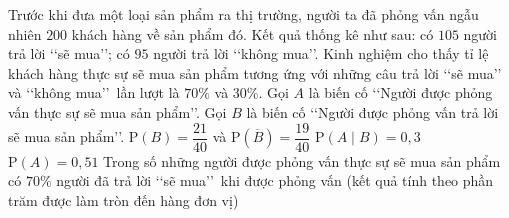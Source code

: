 \begin{ex}%
    Trước khi đưa một loại sản phẩm ra thị trường, người ta đã phỏng vấn ngẫu nhiên $200$ khách hàng về sản phẩm đó. Kết quả thống kê như sau: có $105$ người trả lời 
    \lq\lq  sẽ mua\rq\rq; có $95$ người trả lời \lq\lq  không mua\rq\rq.
    Kinh nghiệm cho thấy tỉ lệ khách hàng thực sự sẽ mua sản phẩm tương ứng với những câu trả lời \lq\lq  sẽ mua\rq\rq\, và \lq\lq  không mua\rq\rq\, lần lượt là $70\%$ và $30\%$. Gọi $A$ là biến cố \lq\lq  Người được phỏng vấn thực sự sẽ mua sản phẩm\rq\rq. Gọi $B$ là biến cố \lq\lq  Người được phỏng vấn trả lời sẽ mua sản phẩm\rq\rq.
    \choiceTF
    {\True $\mathrm{P}(B) = \dfrac{21}{40}$ và $\mathrm{P}(\overline{B}) = \dfrac{19}{40}$}
    {$\mathrm{P}(A \mid B) = 0{,}3$}
    {\True $\mathrm{P}(A) = 0{,}51$}
    {Trong số những người được phỏng vấn thực sự sẽ mua sản phẩm có $70\%$ người đã trả lời \lq\lq  sẽ mua\rq\rq\, khi được phỏng vấn (kết quả tính theo phần trăm được làm tròn đến hàng đơn vị)}
\end{ex}
